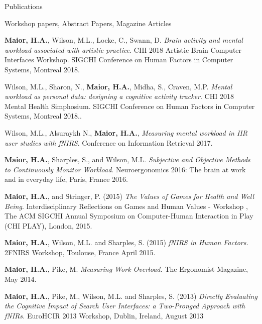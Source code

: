 \documentclass{resume} %
\begin{document}
\begin{rSection}{Publications}
\begin{rSubsection}{ }{ }{ }{Workshop papers, Abstract Papers, Magazine Articles}
	\item \textbf{Maior, H.A.}, Wilson, M.L., Locke, C., Swann, D.  \emph{Brain activity and mental workload associated with artistic practice}. CHI 2018 Artistic Brain Computer Interfaces Workshop. SIGCHI Conference on Human Factors in Computer Systems, Montreal 2018.
	\item Wilson, M.L., Sharon, N., \textbf{Maior, H.A.}, Midha, S., Craven, M.P.  \emph{Mental workload as personal data: designing a cognitive activity tracker}. CHI 2018 Mental Health Simphosium. SIGCHI Conference on Human Factors in Computer Systems, Montreal 2018..
	\item Wilson, M.L., Alsuraykh N., \textbf{Maior, H.A.},  \emph{Measuring mental workload in IIR user studies with fNIRS}. Conference on Information Retrieval 2017.
	\item \textbf{Maior, H.A.}, Sharples, S., and Wilson, M.L. \emph{Subjective and Objective Methods to Continuously Monitor Workload}. Neuroergonomics 2016: The brain at work and in everyday life, Paris, France 2016.
    \item \textbf{Maior, H.A.}, and Stringer, P. (2015) \emph{The Values of Games for Health and Well Being}. Interdisciplinary Reflections on Games and Human Values - Workshop , The ACM SIGCHI Annual Symposium on Computer-Human Interaction in Play (CHI PLAY), London, 2015.
    \item \textbf{Maior, H.A.}, Wilson, M.L. and Sharples, S. (2015) \emph{fNIRS in Human Factors.} 2FNIRS Workshop, Toulouse, France April 2015.
    \item \textbf{Maior, H.A.}, Pike, M. \emph{Measuring Work Overload.} The Ergonomist Magazine, May 2014.
    \item \textbf{Maior, H.A.}, Pike, M., Wilson, M.L. and Sharples, S. (2013) \emph{Directly Evaluating the Cognitive Impact of Search User Interfaces: a Two-Pronged Approach with fNIRs.} EuroHCIR 2013 Workshop, Dublin, Ireland, August 2013
\end{rSubsection}

\end{rSection}
\vspace{-2 mm}

\end{document}
